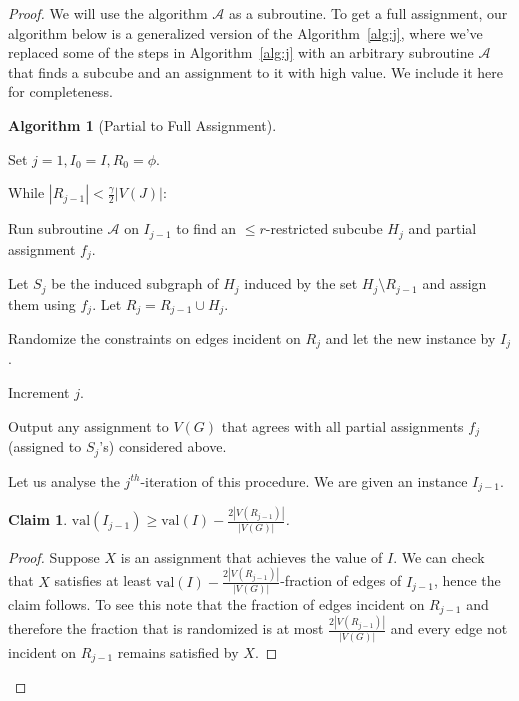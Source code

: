 \documentclass[11pt]{article}
\def \cA {\mathcal{A}}
\def \val {\mathrm{val}}
\newtheorem{claim}[theorem]{Claim}
\theoremstyle{definition}
\newtheorem{algorithm-thm}[theorem]{Algorithm}
\begin{document}
\begin{proof}
We will use the algorithm $\cA$ as a subroutine. To get a full assignment, our algorithm below is a generalized version of the Algorithm~\ref{alg:j}, where we've replaced some of the steps in Algorithm~\ref{alg:j} with an arbitrary subroutine $\cA$ that finds a subcube and an assignment to it with high value. We include it here for completeness.

\begin{algorithm-thm}[Partial to Full Assignment]\label{alg:partial} ~\\ 
\begin{compactenum}
\item Set $j = 1, I_0 = I, R_0 = \phi$.
\item While $|R_{j-1}| < \frac{\gamma}{2}|V(J)|$:
\begin{compactenum}
\item Run subroutine $\cA$ on $I_{j-1}$ to find an $\leq r$-restricted subcube $H_{j}$ and partial assignment $f_j$.
\item Let $S_j$ be the induced subgraph of $H_j$ induced by the set $H_j \setminus R_{j-1}$ and assign them using $f_j$. Let $R_j = R_{j-1} \cup H_j$. 
\item Randomize the constraints on edges incident on $R_j$ and let the new instance by $I_j$. 
\item Increment $j$.
\end{compactenum}
\item Output any assignment to $V(G)$ that agrees with all partial assignments $f_j$ (assigned to $S_j$'s) considered above.
\end{compactenum}
\end{algorithm-thm}


Let us analyse the $j^{th}$-iteration of this procedure. We are given an instance $I_{j-1}$.

\begin{claim}\label{claim:it-drop}
$\val(I_{j-1}) \geq \val(I) - \frac{2|V(R_{j-1})|}{|V(G)|}$.
\end{claim}

\begin{proof}
Suppose $X$ is an assignment that achieves the value of $I$. We can check that $X$ satisfies at least $\val(I) - \frac{2|V(R_{j-1})|}{|V(G)|}$-fraction of edges of $I_{j-1}$, hence the claim follows. To see this note that the fraction of edges incident on $R_{j-1}$ and therefore the fraction that is randomized is at most $\frac{2|V(R_{j-1})|}{|V(G)|}$ and every edge not incident on $R_{j-1}$ remains satisfied by $X$.
\end{proof}


\end{proof}
\end{document}
